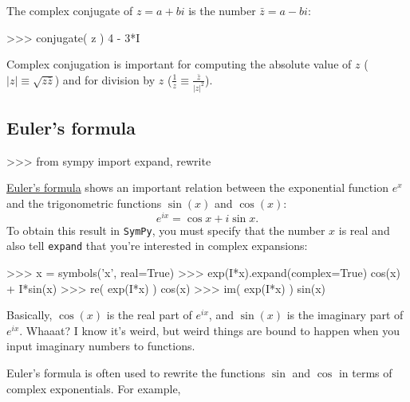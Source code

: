 \noindent
The complex conjugate of $z=a+bi$ is the number $\bar{z} = a-bi$:



\small
\begin{verbatimtab}
>>> conjugate( z )
4 - 3*I
\end{verbatimtab}
\normalsize

\noindent
Complex conjugation is important for computing the absolute value of $z$
($|z|\equiv\sqrt{ z\bar{z} }$) and for division by $z$ ($\frac{1}{z} \equiv \frac{\bar{z}}{|z|^2}$).

\subsection{Euler's formula}
\label{complex_numbers:euler_s_formula}
\small
\begin{verbatimtab}
>>> from sympy import expand, rewrite
\end{verbatimtab}
\normalsize
\href{https://en.wikipedia.org/wiki/Euler's_formula}{Euler's formula} shows an important relation 
between the exponential function $e^x$ and the trigonometric functions $\sin(x)$ and $\cos(x)$:  
\[
  e^{ix} = \cos x + i \sin x.
\]
To obtain this result in \texttt{SymPy}, you must specify that the number $x$ is real
and also tell \texttt{expand} that you're interested in complex expansions:

\small
\begin{verbatimtab}
>>> x = symbols('x', real=True)
>>> exp(I*x).expand(complex=True)
cos(x) + I*sin(x) 
>>> re( exp(I*x) ) 
cos(x)
>>> im( exp(I*x) ) 
sin(x)
\end{verbatimtab}
\normalsize

\noindent
Basically, $\cos(x)$ is the real part of $e^{ix}$,
and $\sin(x)$ is the imaginary part of $e^{ix}$.
Whaaat? 
I know it's weird,
but weird things are bound to happen when you input imaginary numbers to functions.


Euler's formula is often used to rewrite the functions $\sin$ and $\cos$ in terms of complex exponentials.
For example,

